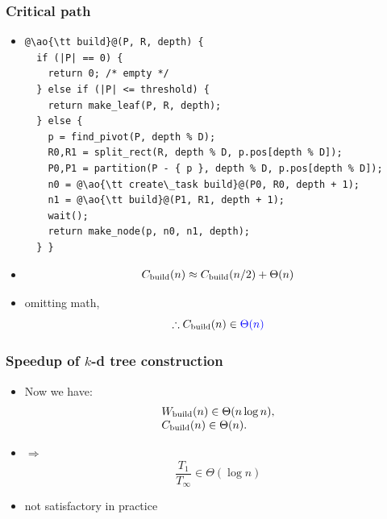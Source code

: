 \documentclass[12pt,dvipdfmx]{beamer}
\newcommand{\ao}[1]{{\color{blue}#1}}
\begin{document}
\begin{frame}[fragile]
\frametitle{Critical path}
\begin{itemize}
\item []
\begin{lstlisting}
@\ao{\tt build}@(P, R, depth) {
  if (|P| == 0) {
    return 0; /* empty */
  } else if (|P| <= threshold) {
    return make_leaf(P, R, depth);
  } else {
    p = find_pivot(P, depth % D);
    R0,R1 = split_rect(R, depth % D, p.pos[depth % D]);
    P0,P1 = partition(P - { p }, depth % D, p.pos[depth % D]);
    n0 = @\ao{\tt create\_task build}@(P0, R0, depth + 1);
    n1 = @\ao{\tt build}@(P1, R1, depth + 1);
    wait();
    return make_node(p, n0, n1, depth);
  } }
\end{lstlisting}

\item []
\[
\begin{array}{l}
C_{\mbox{\scriptsize build}}(n)
\approx C_{\mbox{\scriptsize build}}(n/2) + \Theta(n) \\
\end{array}
\]
\item [] omitting math,
\[ \therefore C_{\mbox{\scriptsize build}}(n) \in \ao{\Theta(n)} \]
\end{itemize}
\end{frame}


\begin{frame}
\frametitle{Speedup of $k$-d tree construction}
\begin{itemize}
\item Now we have:
\[ 
\begin{array}{l}
W_{\mbox{\scriptsize build}}(n) \in \Theta(n\log n), \\
C_{\mbox{\scriptsize build}}(n) \in \Theta(n).
\end{array}
\]

\item $\Rightarrow$ 
\[ \frac{T_1}{T_\infty} \in \Theta(\log n) \]

\item not satisfactory in practice
\end{itemize}
\end{frame}
\end{document}
